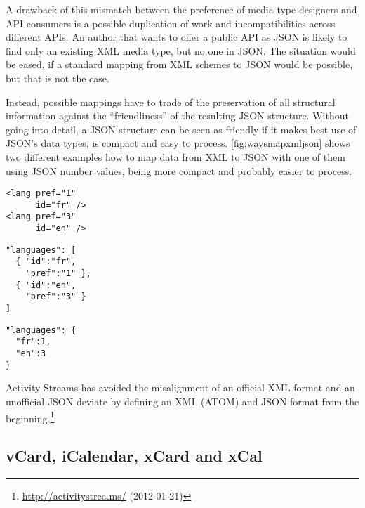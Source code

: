 \documentclass[12pt,a4paper]{scrartcl}		%
\newcommand{\citeurl}[2]{\url{#1} (#2)}
\begin{document}
A drawback of this mismatch between the preference of media type designers and
API consumers is a possible duplication of work and incompatibilities across
different APIs. An author that wants to offer a public API as JSON is likely to
find only an existing XML media type, but no one in JSON.  The situation would
be eased, if a standard mapping from XML schemes to JSON would be possible, but
that is not the case.

Instead, possible mappings have to trade of the preservation of all structural
information against the ``friendliness'' of the resulting JSON
structure\cite{Boyer2011}. Without going into detail, a JSON structure can be
seen as friendly if it makes best use of JSON's data types, is compact and easy
to process. \autoref{fig:waysmapxmljson} shows two different examples how to map
data from XML to JSON with one of them using JSON number values, being more
compact and probably easier to process.

\begin{multicols}{3}
\begin{lstlisting}[label=fig:waysmapxmljson,
                  captionpos=t,
                  caption={XML fragment}, frame=single]
<lang pref="1"
      id="fr" />
<lang pref="3"
      id="en" />
\end{lstlisting}
\columnbreak
\begin{lstlisting}[title={unfriendly JSON}, frame=single,
                  captionpos=t
]
"languages": [
  { "id":"fr",
    "pref":"1" },
  { "id":"en",
    "pref":"3" }
]
\end{lstlisting}
\columnbreak
\begin{lstlisting}[title={friendly JSON}, frame=single,
                  captionpos=t
]
"languages": {
  "fr":1,
  "en":3
}
\end{lstlisting}
\end{multicols}

Activity Streams has avoided the misalignment of an official XML format and an unofficial JSON deviate by defining an XML (ATOM) and JSON format from the beginning.\footnote{\citeurl{http://activitystrea.ms/}{2012-01-21}}


\subsection{vCard, iCalendar, xCard and xCal}
\end{document}
